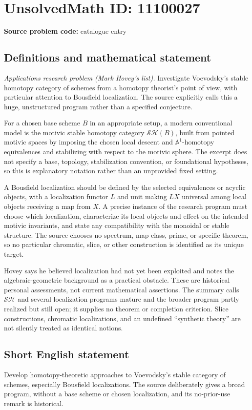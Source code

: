 \documentclass[11pt]{article}
\newcommand{\A}{\mathbb{A}}
\begin{document}
\section*{UnsolvedMath ID: 11100027}
\textbf{Source problem code:} catalogue entry
\subsection{Definitions and mathematical statement}
\emph{Applications research problem (Mark Hovey's list).} Investigate Voevodsky's stable homotopy category of schemes from a homotopy theorist's point of view, with particular attention to Bousfield localization. The source explicitly calls this a huge, unstructured program rather than a specified conjecture.

For a chosen base scheme \(B\) in an appropriate setup, a modern conventional model is the motivic stable homotopy category \(\mathcal{SH}(B)\), built from pointed motivic spaces by imposing the chosen local descent and \(\A^1\)-homotopy equivalences and stabilizing with respect to the motivic sphere. The excerpt does not specify a base, topology, stabilization convention, or foundational hypotheses, so this is explanatory notation rather than an unprovided fixed setting.

A Bousfield localization should be defined by the selected equivalences or acyclic objects, with a localization functor \(L\) and unit making \(LX\) universal among local objects receiving a map from \(X\). A precise instance of the research program must choose which localization, characterize its local objects and effect on the intended motivic invariants, and state any compatibility with the monoidal or stable structure. The source chooses no spectrum, map class, prime, or specific theorem, so no particular chromatic, slice, or other construction is identified as its unique target.

Hovey says he believed localization had not yet been exploited and notes the algebraic-geometric background as a practical obstacle. These are historical personal assessments, not current mathematical assertions. The summary calls \(\mathcal{SH}\) and several localization programs mature and the broader program partly realized but still open; it supplies no theorem or completion criterion. Slice constructions, chromatic localizations, and an undefined ``synthetic theory'' are not silently treated as identical notions.
\subsection{Short English statement}
Develop homotopy-theoretic approaches to Voevodsky's stable category of schemes, especially Bousfield localizations. The source deliberately gives a broad program, without a base scheme or chosen localization, and its no-prior-use remark is historical.
\end{document}
